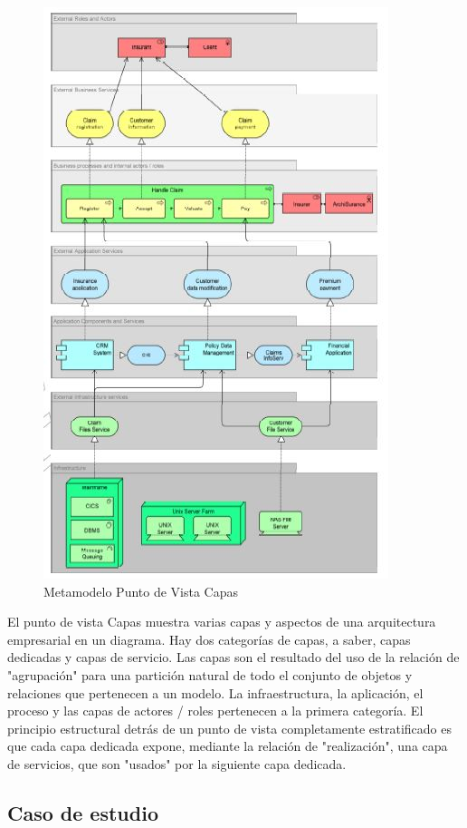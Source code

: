 \begin{figure}[th!]
	\centering
	\includegraphics[width=0.6\linewidth]{arquitectura/imagenes/modeloCapas}
	\caption{Metamodelo Punto de Vista Capas}
	\label{metamodeloCapas}
\end{figure}
El punto de vista Capas muestra varias capas y aspectos de una arquitectura empresarial en un diagrama. Hay dos categorías de capas, a saber, capas dedicadas y capas de servicio. Las capas son el resultado del uso de la relación de "agrupación" para una partición natural de todo el conjunto de objetos y relaciones que pertenecen a un modelo. La infraestructura, la aplicación, el proceso y las capas de actores / roles pertenecen a la primera categoría. El principio estructural detrás de un punto de vista completamente estratificado es que cada capa dedicada expone, mediante la relación de "realización", una capa de servicios, que son "usados" por la siguiente capa dedicada.

\newpage

\subsection{Caso de estudio}

